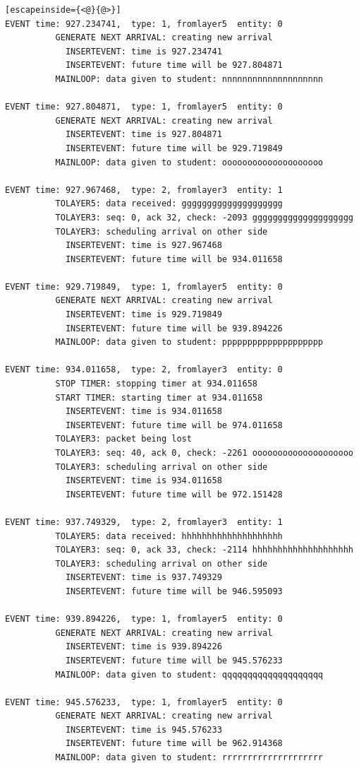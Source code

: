 \documentclass[paper=a4, fontsize=11pt]{scrartcl}
\numberwithin{equation}{section}		%
\numberwithin{figure}{section}			%
\numberwithin{table}{section}				%
\begin{document}
\begin{lstlisting}[escapeinside={<@}{@>}]
EVENT time: 927.234741,  type: 1, fromlayer5  entity: 0
          GENERATE NEXT ARRIVAL: creating new arrival
            INSERTEVENT: time is 927.234741
            INSERTEVENT: future time will be 927.804871
          MAINLOOP: data given to student: nnnnnnnnnnnnnnnnnnnn

EVENT time: 927.804871,  type: 1, fromlayer5  entity: 0
          GENERATE NEXT ARRIVAL: creating new arrival
            INSERTEVENT: time is 927.804871
            INSERTEVENT: future time will be 929.719849
          MAINLOOP: data given to student: oooooooooooooooooooo

EVENT time: 927.967468,  type: 2, fromlayer3  entity: 1
          TOLAYER5: data received: gggggggggggggggggggg
          TOLAYER3: seq: 0, ack 32, check: -2093 gggggggggggggggggggg
          TOLAYER3: scheduling arrival on other side
            INSERTEVENT: time is 927.967468
            INSERTEVENT: future time will be 934.011658

EVENT time: 929.719849,  type: 1, fromlayer5  entity: 0
          GENERATE NEXT ARRIVAL: creating new arrival
            INSERTEVENT: time is 929.719849
            INSERTEVENT: future time will be 939.894226
          MAINLOOP: data given to student: pppppppppppppppppppp

EVENT time: 934.011658,  type: 2, fromlayer3  entity: 0
          STOP TIMER: stopping timer at 934.011658
          START TIMER: starting timer at 934.011658
            INSERTEVENT: time is 934.011658
            INSERTEVENT: future time will be 974.011658
          TOLAYER3: packet being lost
          TOLAYER3: seq: 40, ack 0, check: -2261 oooooooooooooooooooo
          TOLAYER3: scheduling arrival on other side
            INSERTEVENT: time is 934.011658
            INSERTEVENT: future time will be 972.151428

EVENT time: 937.749329,  type: 2, fromlayer3  entity: 1
          TOLAYER5: data received: hhhhhhhhhhhhhhhhhhhh
          TOLAYER3: seq: 0, ack 33, check: -2114 hhhhhhhhhhhhhhhhhhhh
          TOLAYER3: scheduling arrival on other side
            INSERTEVENT: time is 937.749329
            INSERTEVENT: future time will be 946.595093

EVENT time: 939.894226,  type: 1, fromlayer5  entity: 0
          GENERATE NEXT ARRIVAL: creating new arrival
            INSERTEVENT: time is 939.894226
            INSERTEVENT: future time will be 945.576233
          MAINLOOP: data given to student: qqqqqqqqqqqqqqqqqqqq

EVENT time: 945.576233,  type: 1, fromlayer5  entity: 0
          GENERATE NEXT ARRIVAL: creating new arrival
            INSERTEVENT: time is 945.576233
            INSERTEVENT: future time will be 962.914368
          MAINLOOP: data given to student: rrrrrrrrrrrrrrrrrrrr


\end{lstlisting}
\end{document}
